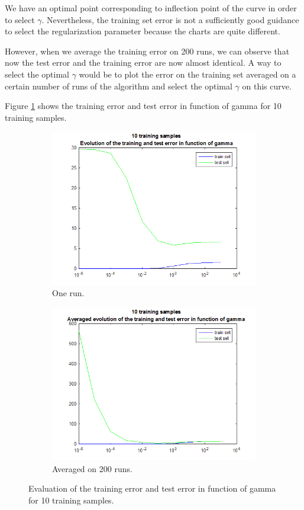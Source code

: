 \documentclass{article} %
\begin{document}
We have an optimal point corresponding to inflection point of the curve in order to select $\gamma$. Nevertheless, the training set error is not a sufficiently good guidance to select the regularization parameter because the charts are quite different. 

However, when we average the training error on 200 runs, we can observe that now the test error and the training error are now almost identical.
A way to select the optimal $\gamma$ would be to plot the error on the training set averaged on a certain number of runs of the algorithm and select the optimal $\gamma$ on this curve. 

Figure \ref{fig:ex4_10} shows the training error and test error in function of gamma for 10 training samples. 
 \begin{figure}[h]
\center
 \begin{subfigure}[b]{0.45\textwidth}
        \includegraphics[width=\textwidth]{4_10}
        \caption{One run.}
    \end{subfigure}
    \begin{subfigure}[b]{0.45\textwidth}
        \includegraphics[width=\textwidth]{4_10_avg}
        \caption{Averaged on 200 runs.}
    \end{subfigure}
    \caption{Evaluation of the training error and test error in function of gamma for 10 training samples.}
    \label{fig:ex4_10}
\end{figure}
\end{document}
